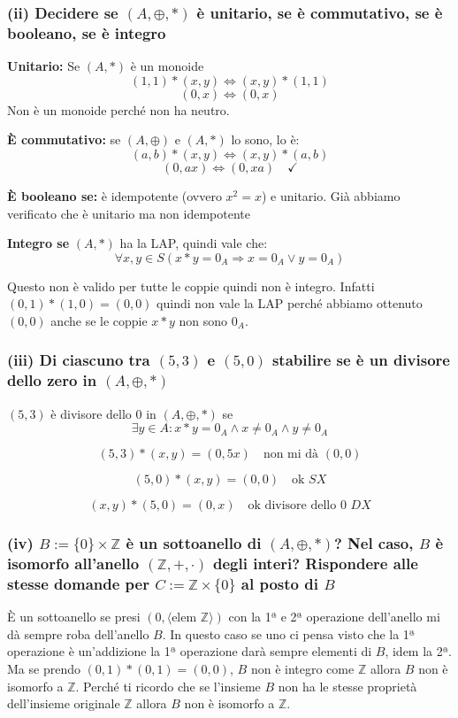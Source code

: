 
\subsubsection*{(ii) Decidere se $(A, \oplus, *)$ è unitario, se è commutativo, se è booleano, se è integro}

\textbf{Unitario:} Se $(A,*)$ è un monoide
$$(1,1) * (x,y) \Leftrightarrow (x,y) * (1,1)$$
$$(0,x) \Leftrightarrow (0,x)$$
Non è un monoide perché non ha neutro.

\textbf{È commutativo:} se $(A,\oplus)$ e $(A,*)$ lo sono, lo è:
$$(a,b) * (x,y) \Leftrightarrow (x,y) * (a,b)$$
$$(0,ax) \Leftrightarrow (0,xa) \quad \checkmark$$

\textbf{È booleano se:} è idempotente (ovvero $x^2 = x$) e unitario. Già abbiamo verificato che è unitario ma non idempotente

\textbf{Integro se} $(A,*)$ ha la LAP, quindi vale che:
$$\forall x, y \in S (x * y = 0_A \Rightarrow x = 0_A \lor y = 0_A)$$

Questo non è valido per tutte le coppie quindi non è integro. Infatti $(0,1) * (1,0) = (0,0)$ quindi non vale la LAP perché abbiamo ottenuto $(0,0)$ anche se le coppie $x*y$ non sono $0_A$.

\subsubsection*{(iii) Di ciascuno tra $(5,3)$ e $(5,0)$ stabilire se è un divisore dello zero in $(A, \oplus, *)$}

$(5,3)$ è divisore dello 0 in $(A, \oplus, *)$ se
$$\exists y \in A : x * y = 0_A \land x \neq 0_A \land y \neq 0_A$$

$$(5,3) * (x,y) = (0,5x) \quad \text{non mi dà } (0,0)$$

$$(5,0) * (x,y) = (0,0) \quad \text{ok } SX$$

$$(x,y) * (5,0) = (0,x) \quad \text{ok divisore dello 0 } DX$$

\subsubsection*{(iv) $B := \{0\} \times \mathbb{Z}$ è un sottoanello di $(A, \oplus, *)$? Nel caso, $B$ è isomorfo all'anello $(\mathbb{Z}, +, \cdot)$ degli interi? Rispondere alle stesse domande per $C := \mathbb{Z} \times \{0\}$ al posto di $B$}

È un sottoanello se presi $(0, \langle \text{elem } \mathbb{Z} \rangle)$ con la 1ª e 2ª operazione dell'anello mi dà sempre roba dell'anello $B$. In questo caso se uno ci pensa visto che la 1ª operazione è un'addizione la 1ª operazione darà sempre elementi di $B$, idem la 2ª. Ma se prendo $(0,1) * (0,1) = (0,0)$, $B$ non è integro come $\mathbb{Z}$ allora $B$ non è isomorfo a $\mathbb{Z}$. Perché ti ricordo che se l'insieme $B$ non ha le stesse proprietà dell'insieme originale $\mathbb{Z}$ allora $B$ non è isomorfo a $\mathbb{Z}$.

